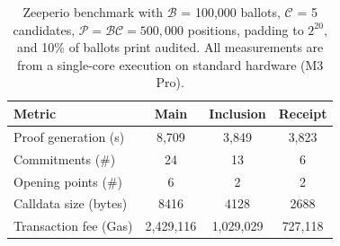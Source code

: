 \begin{table}[t!]
\centering
\caption{Zeeperio benchmark with $\mathcal{B}$ = 100,000 ballots, $\mathcal{C}$ = 5 candidates, $\mathcal{P} = \mathcal{B}\mathcal{C} = 500,000$ positions, padding to $2^20$, and 10\% of ballots print audited. All measurements are from a single-core execution on standard hardware (M3 Pro).}
\begin{tabular}{lccc}
\hline
\textbf{Metric} & \textbf{Main} & \textbf{Inclusion} & \textbf{Receipt} \\
\hline
Proof generation (s) & 8,709 & 3,849 & 3,823 \\
Commitments (\#) & 24 & 13 & 6 \\
Opening points (\#) & 6 & 2 & 2 \\
Calldata size (bytes) & 8416 & 4128 & 2688 \\
Transaction fee (Gas)\footnotemark & 2,429,116 & 1,029,029 & 727,118 \\
\hline
\end{tabular}
\label{tab:eval-table2}
\end{table}
